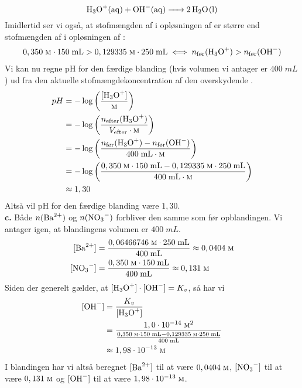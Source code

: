 \documentclass{report}
\begin{document}
\[
\ce{H3O+(aq) + OH-(aq) -> 2H2O(l)} 
\] 
Imidlertid ser vi også, at stofmængden af  i opløsningen af  er større end stofmængden af  i opløsningen af :
\begin{equation*}
\begin{split}
  0,350 \;\unit{\textsc{m}} \cdot 150 \;\unit{mL} > 0,129335 \;\unit{\textsc{m}} \cdot 250 \;\unit{mL} \iff n_{\text{før} }(\ce{H3O+})>n_{\text{før} }(\ce{OH-} )
\end{split}
\end{equation*}
Vi kan nu regne pH for den færdige blanding (hvis volumen vi antager er $400 \;\unit{mL} $) ud fra den aktuelle stofmængdekoncentration af den overskydende . 
\begin{equation*}
\begin{split}
  pH&=-\log \left(\frac{[\ce{H3O+} ]}{\unit{\textsc{m}}}\right) \\ 
  &=-\log \left(\frac{n_{\text{efter} }(\ce{H3O+} )}{V_{\text{efter} } \cdot \textsc{m}}\right) \\
  &= -\log \left(\frac{n_{\text{før}}(\ce{H3O+} )-n_{\text{før} }(\ce{OH-}) }{400 \;\unit{mL \cdot \textsc{m}} }\right) \\ 
  &=-\log \left(\frac{0,350 \;\unit{\textsc{m}} \cdot 150 \;\unit{mL}-0,129335 \;\unit{\textsc{m}} \cdot 250 \;\unit{mL}}{400 \;\unit{mL \cdot \textsc{m}} }\right) \\ 
  &\approx 1,30
\end{split}
\end{equation*}
Altså vil pH for den færdige blanding være $1,30$.\\[1ex]
\textbf{c.}
Både $n(\ce{Ba^2+} )$ og $n(\ce{NO3-}) $ forbliver den samme som før opblandingen.
Vi antager igen, at blandingens volumen er $400 \;\unit{mL} $.
\begin{equation*}
\begin{split}
  [\ce{Ba^2+} ]&=\frac{0,06466746 \;\unit{\textsc{m}}  \cdot 250 \;\unit{mL} }{400 \;\unit{mL} } \approx 0,0404 \;\unit{\textsc{m}} \\ 
  [\ce{NO3-} ]&=\frac{0,350 \;\unit{\textsc{m}} \cdot 150 \;\unit{mL} }{400 \;\unit{mL} } \approx 0,131 \;\unit{\textsc{m}} 
\end{split}
\end{equation*}
Siden der generelt gælder, at $[\ce{H3O+} ] \cdot [\ce{OH-} ]=K_v$, så har vi
\begin{equation*}
\begin{split}
  [\ce{OH-} ]&= \frac{K_v}{[\ce{H3O+} ]}\\ 
  &=\frac{1,0 \cdot 10^{-14} \;\unit{\textsc{m}^2} }{\frac{0,350 \;\unit{\textsc{m}} \cdot 150 \;\unit{mL}-0,129335 \;\unit{\textsc{m}} \cdot 250 \;\unit{mL}}{400 \;\unit{mL}}}\\ 
  &\approx 1,98 \cdot 10^{-13} \;\unit{\textsc{m}} 
\end{split}
\end{equation*}
I blandingen har vi altså beregnet $[\ce{Ba^2+} ]$ til at være $0,0404 \;\unit{\textsc{m}} $, $[\ce{NO3-} ]$ til at være $0,131 \;\unit{\textsc{m}} $ og $[\ce{ OH-}]$ til at være $1,98 \cdot 10^{-13} \;\unit{\textsc{m}} $.
\end{document}
